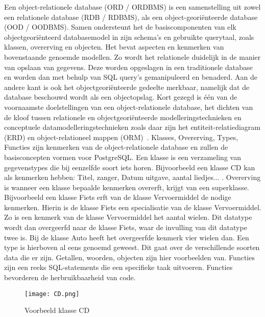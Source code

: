 Een object-relationele database (ORD / ORDBMS) is een samenstelling uit zowel een relationele database (RDB / RDBMS), als een object-georiënteerde database (OOD / OODBMS). Samen ondersteunt het de basiscomponenten van elk objectgeoriënteerd databasemodel in zijn schema's en gebruikte querytaal, zoals klassen, overerving en objecten. Het bevat aspecten en kenmerken van bovenstaande genoemde modellen. Zo wordt het relationele duidelijk in de manier van opslaan van gegevens. Deze worden opgeslagen in een traditionele database en worden dan met behulp van SQL query's gemanipuleerd en benaderd. Aan de andere kant is ook het objectgeoriënteerde gedeelte merkbaar, namelijk dat de database beschouwd wordt als een objectopslag. Kort gezegd is één van de voornaamste doelstellingen van een object-relationele database, het dichten van de kloof tussen relationele en objectgeoriënteerde modelleringstechnieken en conceptuele datamodelleringstechnieken zoals daar zijn het entiteit-relatiediagram (ERD) en object-relationeel mappen (ORM)~\autocite{Technopedia2021}. %
Klasses, Overerving, Types, Functies zijn kenmerken van de object-relationele database en zullen de basisconcepten vormen voor PostgreSQL. Een klasse is een verzameling van gegevenstypes die bij eenzelfde soort iets horen. Bijvoorbeeld een klasse CD kan als kenmerken hebben: Titel, zanger, Datum uitgave, aantal liedjes... . Overerving is wanneer een klasse bepaalde kenmerken overerft, krijgt van een superklasse. Bijvoorbeeld een klasse Fiets erft van de klasse Vervoermiddel de nodige kenmerken. Hierin is de klasse Fiets een specialisatie van de klasse Vervoermiddel. Zo is een kenmerk van de klasse Vervoermiddel het aantal wielen. Dit datatype wordt dan overgeerfd naar de klasse Fiets, waar de invulling van dit datatype twee is. Bij de klasse Auto heeft het overgeerfde kenmerk vier wielen dan. Een type is hierboven al eens genoemd geweest. Dit gaat over de verschillende soorten data die er zijn. Getallen, woorden, objecten zijn hier voorbeelden van. Functies zijn een reeks SQL-statements die een specifieke taak uitvoeren. Functies bevorderen de herbruikbaarheid van code.


\begin{figure}[!h]
    \centering
    \texttt{[image: CD.png]}
    \caption{Voorbeeld klasse CD}
    \label{fig:Voorbeeld klasse CD}
\end{figure}

